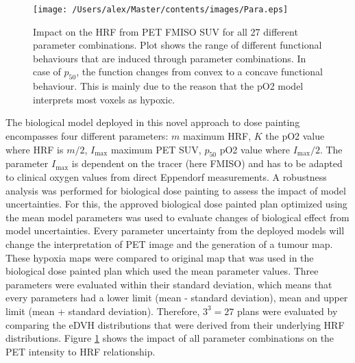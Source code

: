 \begin{figure}[htb]
\centering
\texttt{[image: /Users/alex/Master/contents/images/Para.eps]}
\vspace{1cm}
\caption{Impact on the HRF from PET FMISO SUV for all 27 different parameter combinations. Plot shows the range of different functional behaviours that are induced through parameter combinations. In case of $p_{50}$, the function changes from convex to a concave functional behaviour. This is mainly due to the reason that the pO2 model interprets most voxels as hypoxic.}
\label{fig:para}
\end{figure}
The biological model deployed in this novel approach to dose painting encompasses four different parameters: $m$ maximum HRF, $K$ the pO2 value where HRF is $m/2$, $I_\mathrm{max}$ maximum PET SUV, $p_{50}$ pO2 value where $I_\mathrm{max}/2$. The parameter $I_\mathrm{max}$ is dependent on the tracer (here FMISO) and has to be adapted to clinical oxygen values from direct Eppendorf measurements. A robustness analysis was performed for biological dose painting to assess the impact of model uncertainties. For this, the approved biological dose painted plan optimized using the mean model parameters was used to evaluate changes of biological effect from model uncertainties. Every parameter uncertainty from the deployed models will change the interpretation of PET image and the generation of a tumour map. These hypoxia maps were compared to original map that was used in the biological dose painted plan which used the mean parameter values. Three parameters were evaluated within their standard deviation, which means that every parameters had a lower limit (mean - standard deviation), mean and upper limit (mean + standard deviation). Therefore, $3^3=27$ plans were evaluated by comparing the eDVH distributions that were derived from their underlying HRF distributions. Figure \ref{fig:para} shows the impact of all parameter combinations on the PET intensity to HRF relationship.
